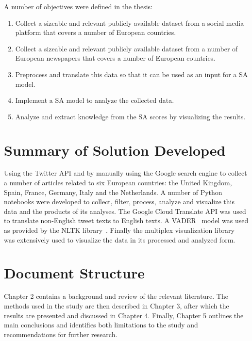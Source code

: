 \noindent A number of objectives were defined in the thesis:

\begin{enumerate}
  \item Collect a sizeable and relevant publicly available dataset from a social media platform that covers a number of European countries.
  \item Collect a sizeable and relevant publicly available dataset from a number of European newspapers that covers a number of European countries.
  \item Preprocess and translate this data so that it can be used as an input for a \ac{SA} model.
  \item Implement a \ac{SA} model to analyze the collected data.
  \item Analyze and extract knowledge from the \ac{SA} scores by visualizing the results.
\end{enumerate}

\section{Summary of Solution Developed}

Using the Twitter \ac{API} and by manually using the Google search engine to collect a number of articles related to six European countries: the United Kingdom, Spain, France, Germany, Italy and the Netherlands.
A number of Python notebooks were developed to collect, filter, process, analyze and visualize this data and the products of its analyses.
The Google Cloud Translate \ac{API} was used to translate non-English tweet texts to English texts.
A \ac{VADER}~\citep{Hutto_Gilbert_2014} model was used as provided by the \ac{NLTK} library~\citep{bird2009natural}.
Finally the multiplex visualization library~\citep{Mamo2021} was extensively used to visualize the data in its processed and analyzed form.


\section{Document Structure}

Chapter 2 contains a background and review of the relevant literature.
The methods used in the study are then described in Chapter 3, after which the results are presented and discussed in Chapter 4.
Finally, Chapter 5 outlines the main conclusions and identifies both limitations to the study and recommendations for further research.

